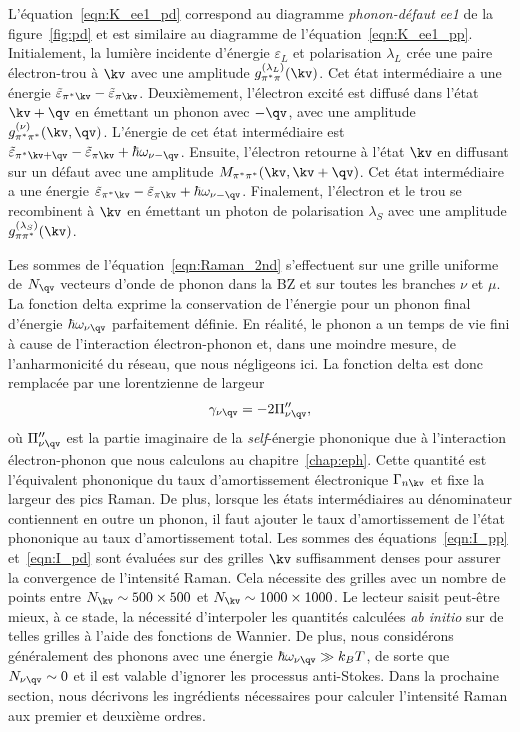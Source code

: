 L'équation~\eqref{eqn:K_ee1_pd} correspond au diagramme \textit{phonon-défaut} \textit{ee1} de la figure~\ref{fig:pd} et est similaire au diagramme de l'équation~\eqref{eqn:K_ee1_pp}. Initialement, la lumière incidente d'énergie $\varepsilon_L$ et polarisation $\lambda_L$ crée une paire électron-trou à $\kv$ avec une amplitude $g_{\pi^*\pi}^{(\lambda_L)}(\kv)$. Cet état intermédiaire a une énergie $\tilde{\varepsilon}_{\pi^*\kv}-\tilde{\varepsilon}_{\pi\kv}$. Deuxièmement, l'électron excité est diffusé dans l'état $\kv+\qv$ en émettant un phonon avec $-\qv$, avec une amplitude $g_{\pi^*\pi^*}^{(\nu)}(\kv,\qv)$. L'énergie de cet état intermédiaire est $\tilde{\varepsilon}_{\pi^*\kv+\qv}-\tilde{\varepsilon}_{\pi\kv}+\hbar\omega_{\nu-\qv}$. Ensuite, l'électron retourne à l'état $\kv$ en diffusant sur un défaut avec une amplitude $M_{\pi^*\pi^*}(\kv,\kv+\qv)$. Cet état intermédiaire a une énergie $\tilde{\varepsilon}_{\pi^*\kv}-\tilde{\varepsilon}_{\pi\kv}+\hbar\omega_{\nu-\qv}$. Finalement, l'électron et le trou se recombinent à $\kv$ en émettant un photon de polarisation $\lambda_S$ avec une amplitude $g_{\pi\pi^*}^{(\lambda_S)}(\kv)$.

Les sommes de l'équation~\eqref{eqn:Raman_2nd} s'effectuent sur une grille uniforme de $N_\qv$ vecteurs d'onde de phonon dans la BZ et sur toutes les branches $\nu$ et $\mu$. La fonction delta exprime la conservation de l'énergie pour un phonon final d'énergie $\hbar\omega_{\nu\qv}$ parfaitement définie. En réalité, le phonon a un temps de vie fini à cause de l'interaction électron-phonon et, dans une moindre mesure, de l'anharmonicité du réseau, que nous négligeons ici. La fonction delta est donc remplacée par une lorentzienne de largeur
\begin{equation}
    \gamma_{\nu\qv} = -2\Pi''_{\nu\qv},
\end{equation}
où $\Pi''_{\nu\qv}$ est la partie imaginaire de la \textit{self}-énergie phononique due à l'interaction électron-phonon que nous calculons au chapitre~\ref{chap:eph}. Cette quantité est l'équivalent phononique du taux d'amortissement électronique $\Gamma_{n\kv}$ et fixe la largeur des pics Raman. De plus, lorsque les états intermédiaires au dénominateur contiennent en outre un phonon, il faut ajouter le taux d'amortissement de l'état phononique au taux d'amortissement total. Les sommes des équations~\eqref{eqn:I_pp} et~\eqref{eqn:I_pd} sont évaluées sur des grilles $\kv$ suffisamment denses pour assurer la convergence de l'intensité Raman. Cela nécessite des grilles avec un nombre de points entre $N_\kv\sim 500\times 500$ et $N_\kv\sim 1000\times 1000$. Le lecteur saisit peut-être mieux, à ce stade, la nécessité d'interpoler les quantités calculées \textit{ab initio} sur de telles grilles à l'aide des fonctions de Wannier. De plus, nous considérons généralement des phonons avec une énergie $\hbar\omega_{\nu\qv}\gg k_BT$, de sorte que $N_{\nu\qv}\sim 0$ et il est valable d'ignorer les processus anti-Stokes. Dans la prochaine section, nous décrivons les ingrédients nécessaires pour calculer l'intensité Raman aux premier et deuxième ordres.

